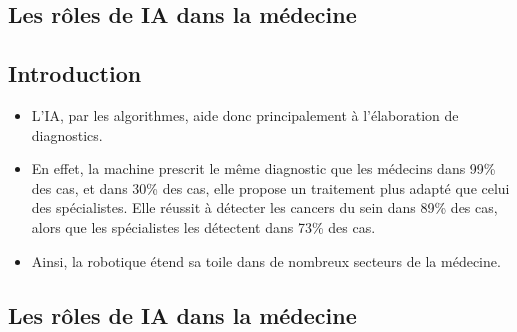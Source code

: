 \begin{titlepage}
	\begin{center}
		\chapter{Les rôles de \textbf{IA} dans la médecine}
		\minitoc

		\vspace{5cm}
		\pgfspectra[element=He,absorption]
	\end{center}
	\vfill %
\end{titlepage}
\pagestyle{monstyle}\setcounter{page}{5}

\section{Introduction}
  \begin{itemize}
        \item L'IA, par les algorithmes, aide donc principalement à l'élaboration de
              diagnostics.
        \item En effet, la machine prescrit le même diagnostic que les
              médecins dans 99\% des cas, et dans 30\% des cas, elle propose un
              traitement plus adapté que celui des spécialistes. Elle réussit à
              détecter les cancers du sein dans 89\% des cas, alors que les
              spécialistes les détectent dans 73\% des cas.
        \item Ainsi, la robotique étend sa toile dans de nombreux secteurs de
            la médecine.
  \end{itemize}
\section{Les rôles de \textbf{IA} dans la médecine}

